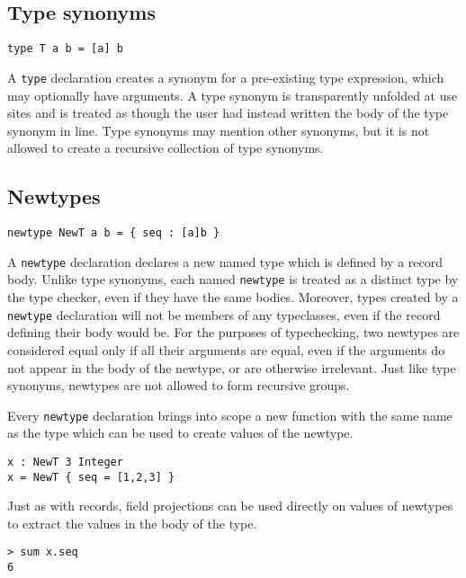 \hypertarget{type-synonyms}{%
\subsection{Type synonyms}\label{type-synonyms}}

\begin{verbatim}
type T a b = [a] b
\end{verbatim}

A \texttt{type} declaration creates a synonym for a pre-existing type
expression, which may optionally have arguments. A type synonym is
transparently unfolded at use sites and is treated as though the user
had instead written the body of the type synonym in line. Type synonyms
may mention other synonyms, but it is not allowed to create a recursive
collection of type synonyms.

\hypertarget{newtypes}{%
\subsection{Newtypes}\label{newtypes}}

\begin{verbatim}
newtype NewT a b = { seq : [a]b }
\end{verbatim}

A \texttt{newtype} declaration declares a new named type which is
defined by a record body. Unlike type synonyms, each named
\texttt{newtype} is treated as a distinct type by the type checker, even
if they have the same bodies. Moreover, types created by a
\texttt{newtype} declaration will not be members of any typeclasses,
even if the record defining their body would be. For the purposes of
typechecking, two newtypes are considered equal only if all their
arguments are equal, even if the arguments do not appear in the body of
the newtype, or are otherwise irrelevant. Just like type synonyms,
newtypes are not allowed to form recursive groups.

Every \texttt{newtype} declaration brings into scope a new function with
the same name as the type which can be used to create values of the
newtype.

\begin{verbatim}
x : NewT 3 Integer
x = NewT { seq = [1,2,3] }
\end{verbatim}

Just as with records, field projections can be used directly on values
of newtypes to extract the values in the body of the type.

\begin{verbatim}
> sum x.seq
6
\end{verbatim}

